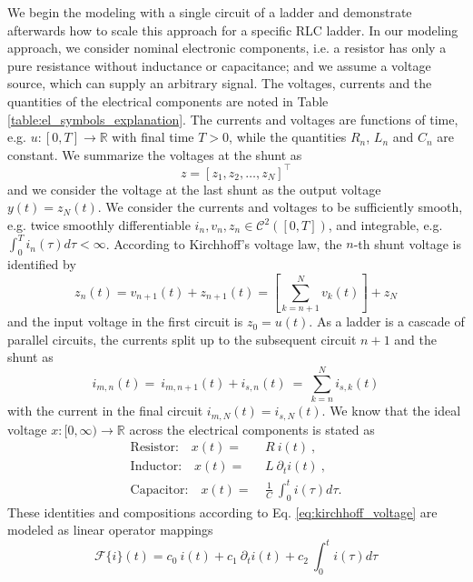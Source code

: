 \documentclass[a4paper, 10pt, twoside, twocolumn]{scrartcl}
\begin{document}
We begin the modeling with a single circuit of a ladder and demonstrate afterwards how to scale this approach for a specific RLC ladder. In our modeling approach, we consider nominal electronic components, i.e. a resistor has only a pure resistance without inductance or capacitance; and we assume a voltage source, which can supply an arbitrary signal. The voltages, currents and the quantities of the electrical components are noted in Table \ref{table:el_symbols_explanation}. The currents and voltages are functions of time, e.g. $u: [0,T] \rightarrow\mathbb{R}$ with final time $T>0$, while the quantities 	$R_{n}$, $L_{n}$ and $C_{n}$ are constant. We summarize the voltages at the shunt as 
\begin{equation}
	z = \left[z_{1}, z_{2}, \ldots, z_{N}\right]^{\top} \label{eq:z_voltages_shunt}
\end{equation}
and we consider the voltage at the last shunt as the output voltage $y(t) = z_{N}(t)$. We consider the currents and voltages to be sufficiently smooth, e.g. twice smoothly differentiable $i_{n}, v_{n}, z_{n} \in \mathcal{C}^{2}([0,T])$, and integrable, e.g. $\int_{0}^{T} i_{n}(\tau) d\tau < \infty$. According to Kirchhoff's voltage law, the $n$-th shunt voltage is identified by
\begin{equation}
	z_{n}(t) = v_{n+1}(t) + z_{n+1}(t) = \left[\sum_{k=n+1}^{N} v_{k}(t)\right] + z_{N} \label{eq:kirchhoff_voltage}
\end{equation}
and the input voltage in the first circuit is $z_{0} = u(t)$. As a ladder is a cascade of parallel circuits, the currents split up to the subsequent circuit $n+1$ and the shunt as
\begin{equation}
	i_{m,n}(t) =~ i_{m,n+1}(t) + i_{s,n}(t) ~=~ \sum_{k=n}^{N} i_{s,k}(t) \label{eq:kirchhoff_current}
\end{equation}
with the current in the final circuit $i_{m,N}(t) = i_{s,N}(t)$. We know that the ideal voltage $x:[0,\infty) \rightarrow \mathbb{R}$ across the electrical components is stated as 
\begin{align*}
	\text{Resistor:} \quad x(t) =&~ R ~ i(t) ~\text{,}\\
	\text{Inductor:} \quad x(t) =&~ L ~ \partial_{t} i(t) ~\text{,}\\
	\text{Capacitor:} \quad x(t) =&~ \frac{1}{C} ~ \int_{0}^{t} i(\tau) d\tau \text{.}
\end{align*}
These identities and compositions according to Eq. \eqref{eq:kirchhoff_voltage} are modeled as linear operator mappings 
\begin{equation*}
	\mathcal{F}\{i\}(t) = c_{0} ~ i(t) +  c_{1}~ \partial_{t} i(t) +  c_{2}~ \int_{0}^{t} i(\tau) d\tau 
\end{equation*}
\end{document}
